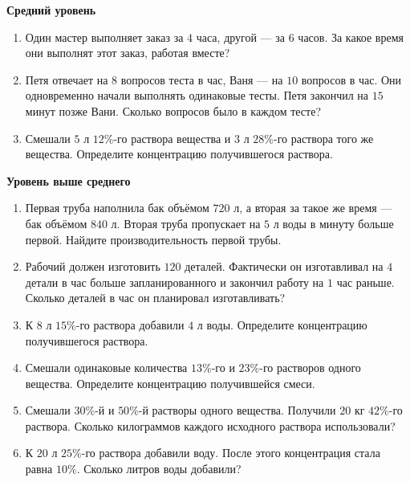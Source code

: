 \documentclass[a4paper,12pt]{article}
\newcommand{\subtopic}[1]{%
    \vspace{0.4em}
    {\large\bfseries\color{darkaccent}#1}\par
    \vspace{0.15em}
}
\begin{document}
\subtopic{Средний уровень}

\begin{enumerate}

\item
Один мастер выполняет заказ за $4$ часа, другой --- за $6$ часов.
За какое время они выполнят этот заказ, работая вместе?

\item
Петя отвечает на $8$ вопросов теста в час, Ваня --- на $10$ вопросов в час.
Они одновременно начали выполнять одинаковые тесты.
Петя закончил на $15$ минут позже Вани.
Сколько вопросов было в каждом тесте?

\item
Смешали $5$ л $12\%$-го раствора вещества и $3$ л $28\%$-го раствора того же вещества.
Определите концентрацию получившегося раствора.

\end{enumerate}

\subtopic{Уровень выше среднего}

\begin{enumerate}[resume]

\item
Первая труба наполнила бак объёмом $720$ л, а вторая за такое же время --- бак объёмом $840$ л.
Вторая труба пропускает на $5$ л воды в минуту больше первой.
Найдите производительность первой трубы.

\item
Рабочий должен изготовить $120$ деталей.
Фактически он изготавливал на $4$ детали в час больше запланированного и закончил работу на $1$ час раньше.
Сколько деталей в час он планировал изготавливать?

\item
К $8$ л $15\%$-го раствора добавили $4$ л воды.
Определите концентрацию получившегося раствора.

\item
Смешали одинаковые количества $13\%$-го и $23\%$-го растворов одного вещества.
Определите концентрацию получившейся смеси.

\item
Смешали $30\%$-й и $50\%$-й растворы одного вещества.
Получили $20$ кг $42\%$-го раствора.
Сколько килограммов каждого исходного раствора использовали?

\item
К $20$ л $25\%$-го раствора добавили воду.
После этого концентрация стала равна $10\%$.
Сколько литров воды добавили?

\end{enumerate}
\end{document}
